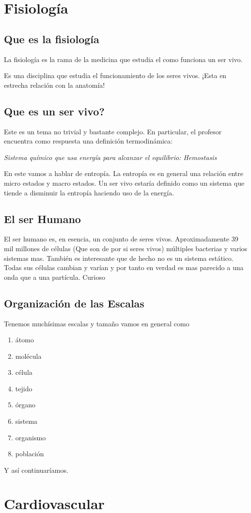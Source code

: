 


    

    \section{Fisiología}
    \subsection{Que es la fisiología}

    La fisiología es la rama de la medicina que estudia el como funciona un ser vivo.

    Es una disciplina que estudia el funcionamiento de los seres vivos. ¡Esta en estrecha relación con la anatomía!  \subsection{Que es un ser vivo?}

    Este es un tema no trivial y bastante complejo. En particular, el profesor encuentra como respuesta una definición termodinámica:

    \textit{
      Sistema químico que usa energía para alcanzar el equilibrio: Hemostasis}

      En este vamos a hablar de entropía. La entropía es en general una relación entre micro estados y macro estados. Un ser vivo estaría definido como un sistema que tiende a disminuir la entropía haciendo uso de la energía.

      \subsection{El ser Humano}

      El ser humano es, en esencia, un conjunto de seres vivos. Aproximadamente 39 mil millones de células (Que son de por si seres vivos) múltiples bacterias y varios sistemas mas. También es interesante que de hecho no es un sistema estático. Todas sus células cambian y varían y por tanto en verdad es mas parecido a una onda que a una partícula. Curioso

      \subsection{Organización de las Escalas}
      
      Tenemos muchísimas escalas y tamaño vamos en general como
       \begin{enumerate}
        \item átomo
	\item molécula
	\item célula
	\item tejido
	\item órgano
	\item sistema
	\item organismo
	\item población
      \end{enumerate}

      Y así continuaríamos.
      \section{Cardiovascular}





